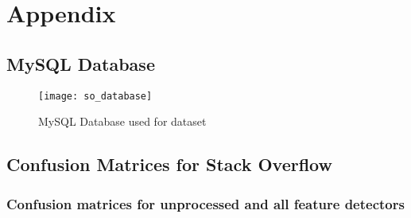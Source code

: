 \appendix

\chapter{Appendix}
\label{app:acronyms}
\printindex
\printglossaries


\clearpage
\section{MySQL Database}
\label{app:mysql_database}
\begin{figure}[ht]
	\centering
    \texttt{[image: so\_database]}
	\caption{MySQL Database used for dataset}
	\label{fig:mysql_database}
\end{figure}

\clearpage
\section{Confusion Matrices for Stack Overflow}
\label{app:confusion_matrix}
\subsection{Confusion matrices for unprocessed and all feature detectors}

